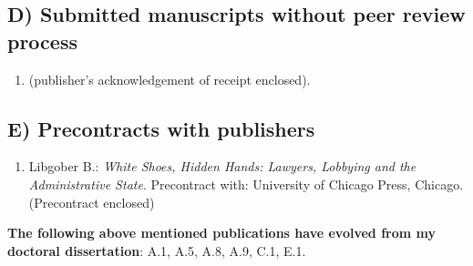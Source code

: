 \documentclass[12pt]{article}
\begin{document}
\subsection*{D) Submitted manuscripts without peer review process}
\begin{enumerate}
    \item {} (publisher's acknowledgement of receipt enclosed).
\end{enumerate}

\subsection*{E) Precontracts with publishers}
 \begin{enumerate}
     \item Libgober B.: \textit{White Shoes, Hidden Hands: Lawyers, Lobbying and the Administrative State}. Precontract with: University of Chicago Press, Chicago. (Precontract enclosed)
\end{enumerate}



\noindent
\textbf{The following above mentioned publications have evolved from my doctoral dissertation}: A.1, A.5, A.8, A.9, C.1, E.1.
\end{document}
